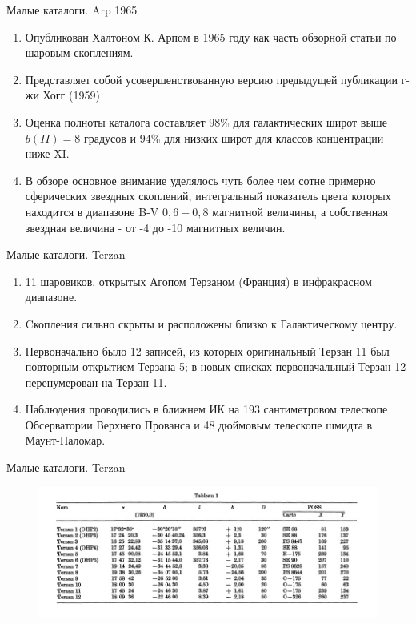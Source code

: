 \documentclass{beamer}
\begin{document}
    \begin{frame}{Малые каталоги. Arp 1965}
        \begin{enumerate}[]
            \item Опубликован Халтоном К. Арпом в 1965 году как часть обзорной статьи по шаровым скоплениям.
            \item Представляет собой усовершенствованную версию предыдущей публикации г-жи Хогг (1959)\cite{Hogg1959}
            \item Оценка полноты каталога составляет $98$\% для галактических широт выше $b(II) = 8$ градусов и $94$\% для низких широт для классов концентрации ниже XI.
            \item В обзоре основное внимание уделялось чуть более чем сотне примерно сферических звездных скоплений, интегральный показатель цвета которых находится в диапазоне B-V $0,6 - 0,8$ магнитной величины, а собственная звездная величина - от -4 до -10 магнитных величин.
        \end{enumerate}
    \end{frame}
    \begin{frame}{Малые каталоги. Terzan}
        \begin{enumerate}[]
            \item 11 шаровиков, открытых Агопом Терзаном (Франция) в инфракрасном диапазоне.
            \item Cкопления сильно скрыты и расположены близко к Галактическому центру. 
            \item Первоначально было 12 записей, из которых оригинальный Терзан 11 был повторным открытием Терзана 5; в новых списках первоначальный Терзан 12 перенумерован на Терзан 11.
            \item Наблюдения проводились в ближнем ИК на 193 сантиметровом телескопе Обсерватории Верхнего Прованса и 48 дюймовым телескопе шмидта в Маунт-Паломар. 
        \end{enumerate}
    \end{frame}
    \begin{frame}{Малые каталоги. Terzan}
        \begin{figure}[h]
            \centering
            \includegraphics[width=0.9\linewidth]{pictures/Terzan.jpg}
        \end{figure}
    \end{frame}
\end{document}
